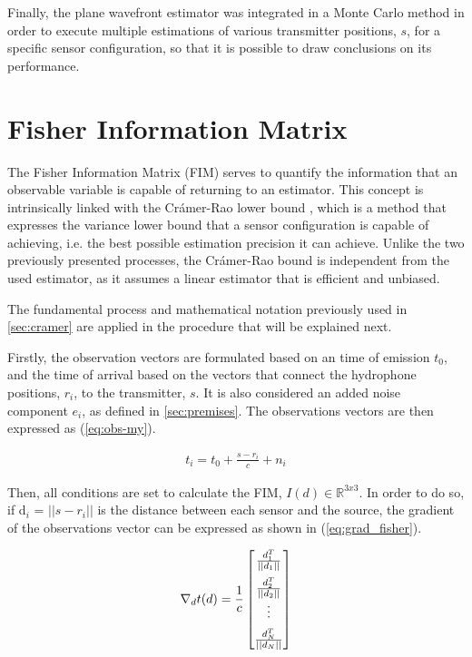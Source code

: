 Finally, the plane wavefront estimator was integrated in a Monte Carlo method in order to execute multiple estimations of various transmitter positions, $s$, for a specific sensor configuration, so that it is possible to draw conclusions on its performance.

\section{Fisher Information Matrix} \label{sucsec:FIM}

The Fisher Information Matrix (FIM) serves to quantify the information that an observable variable is capable of returning to an estimator. This concept is intrinsically linked with the Crámer-Rao lower bound \cite{bishop-cramer-rao}, which is a method that expresses the variance lower bound that a sensor configuration is capable of achieving, i.e. the best possible estimation precision it can achieve. Unlike the two previously presented processes, the Crámer-Rao bound is independent from the used estimator, as it assumes a linear estimator that is efficient and unbiased.

The fundamental process and mathematical notation previously used in \ref{sec:cramer} are applied in the procedure that will be explained next.

Firstly, the observation vectors are formulated based on an time of emission $t_0$, and the time of arrival based on the vectors that connect the hydrophone positions, $r_i$, to the transmitter, $s$. It is also considered an added noise component $e_i$, as defined in \ref{sec:premises}. The observations vectors are then expressed as (\ref{eq:obs-my}).

\begin{eqnarray}
	t_i = t_0 + \frac{s - r_i}{c} + n_i 
	\label{eq:obs-my}
\end{eqnarray}

Then, all conditions are set to calculate the FIM,  $I(d) \in \mathbb{R}^{3x3}$. In order to do so, if d$_{i}$ = $|| s - r_{i} ||$ is the distance between each sensor and the source, the gradient of the observations vector can be expressed as shown in (\ref{eq:grad_fisher}).

\begin{eqnarray}
	\nabla_{d}t(d) = \frac{1}{c} 
	\begin{bmatrix}
		\frac{d_1^T}{||d_1||} \\ 
		\addlinespace
		\frac{d_2^T}{||d_2||} \\
		\vdots \\
		\addlinespace
		\frac{d_N^T}{||d_N||}
	\end{bmatrix}
	\label{eq:grad_fisher}
\end{eqnarray}

